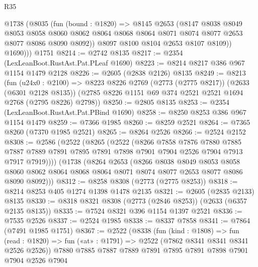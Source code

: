 \begin{lexlean}{R35}
\begin{coremodule}
        @1738
          (@8035
            (fun (bound : @1820) =>
            @8145
              @2653
              (@8147
                @8038
                @8049
                @8053
                @8058
                @8060
                @8062
                @8064
                @8068
                @8064
                @8071
                @8074
                @8077
                @2653
                @8077
                @8086
                @8090
                @8092))
            @8097
            @8100
            @8104
            @2653
            @8107
            @8109))
          @1690)))
    @1751
@8214 := @2742 @8135
@8217 := @2354 (LexLeanBoot.RustAst.Pat.PLeaf @1690)
@8223 := @8214 @8217 @386 @967 @1154 @1479 @2128
@8226 := @2605 (@2838 @2126) @8135
@8249 := @8213
    (fun (u24x0 : @2100) =>
    @8223
      @8226
      @2769
      (@2773 (@2775 @8217))
      (@2633 (@6301 @2128 @8135))
      (@2785 @8226 @1151 @69 @374 @2521 @2521 @1694 @2768 (@2795 @8226) @2798))
@8250 := @2805 @8135
@8253 := @2354 (LexLeanBoot.RustAst.Pat.PBind @1690)
@8258 := @8250 @8253 @386 @967 @1154 @1479
@8259 := @7366 @1985
@8260 := @8259 @2521
@8264 := @7365 @8260 (@7370 @1985 @2521)
@8265 := @8264 @2526
@8266 := @2524 @2152
@8308 := @2586
    (@2522
      (@8265
        (@2522
          (@8266
            @7858
            @7876
            @7880
            @7885
            @7887
            @7889
            @7891
            @7895
            @7891
            @7898
            @7901
            @7904
            @2526
            @7904
            @7913
            @7917
            @7919))))
    (@1738
      (@8264
        @2653
        (@8266
          @8038
          @8049
          @8053
          @8058
          @8060
          @8062
          @8064
          @8068
          @8064
          @8071
          @8074
          @8077
          @2653
          @8077
          @8086
          @8090
          @8092)))
@8312 := @8258 @8308 (@2773 (@2775 @8253))
@8318 := @8214 @8253 @405 @1274 @1398 @1478 @2135
@8321 := @2605 (@2835 @2133) @8135
@8330 := @8318 @8321 @8308 (@2773 (@2846 @8253)) (@2633 (@6357 @2135 @8135))
@8335 := @7524 @8321 @396 @1154 @1397 @2521
@8336 := @7535 @2526
@8337 := @2524 @1985
@8338 := @8337 @7858
@8341 := @7864 (@7491 @1985 @1751)
@8367 := @2522
    (@8338
      (fun (kind : @1808) =>
      fun (read : @1820) => fun («at» : @1791) => @2522 (@7862 @8341 @8341 @8341 @2526 @2526))
      @7880
      @7885
      @7887
      @7889
      @7891
      @7895
      @7891
      @7898
      @7901
      @7904
      @2526
      @7904

\end{coremodule}
\end{lexlean}
